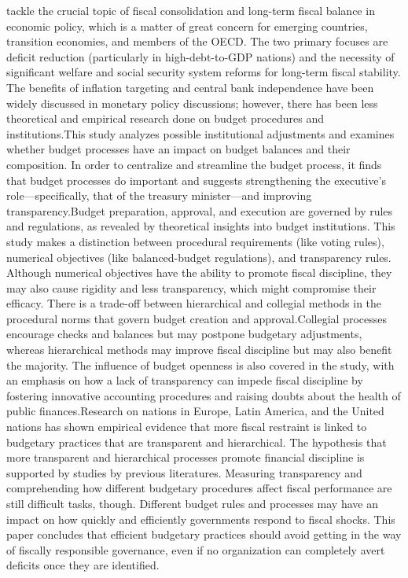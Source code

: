  tackle the crucial topic of fiscal consolidation and long-term fiscal balance in economic policy, which is a matter of great concern for emerging countries, transition economies, and members of the OECD. The two primary focuses are deficit reduction (particularly in high-debt-to-GDP nations) and the necessity of significant welfare and social security system reforms for long-term fiscal stability. The benefits of inflation targeting and central bank independence have been widely discussed in monetary policy discussions; however, there has been less theoretical and empirical research done on budget procedures and institutions.This study analyzes possible institutional adjustments and examines whether budget processes have an impact on budget balances and their composition. In order to centralize and streamline the budget process, it finds that budget processes do important and suggests strengthening the executive's role—specifically, that of the treasury minister—and improving transparency.Budget preparation, approval, and execution are governed by rules and regulations, as revealed by theoretical insights into budget institutions. This study makes a distinction between procedural requirements (like voting rules), numerical objectives (like balanced-budget regulations), and transparency rules. Although numerical objectives have the ability to promote fiscal discipline, they may also cause rigidity and less transparency, which might compromise their efficacy. There is a trade-off between hierarchical and collegial methods in the procedural norms that govern budget creation and approval.Collegial processes encourage checks and balances but may postpone budgetary adjustments, whereas hierarchical methods may improve fiscal discipline but may also benefit the majority. The influence of budget openness is also covered in the study, with an emphasis on how a lack of transparency can impede fiscal discipline by fostering innovative accounting procedures and raising doubts about the health of public finances.Research on nations in Europe, Latin America, and the United nations has shown empirical evidence that more fiscal restraint is linked to budgetary practices that are transparent and hierarchical. The hypothesis that more transparent and hierarchical processes promote financial discipline is supported by studies by previous literatures. Measuring transparency and comprehending how different budgetary procedures affect fiscal performance are still difficult tasks, though. Different budget rules and processes may have an impact on how quickly and efficiently governments respond to fiscal shocks. This paper concludes that efficient budgetary practices should avoid getting in the way of fiscally responsible governance, even if no organization can completely avert deficits once they are identified.\\
